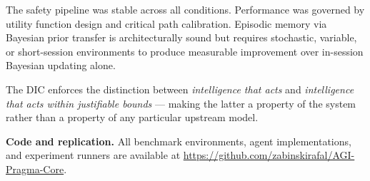 \documentclass[11pt,letterpaper]{article}
\begin{document}
The safety pipeline was stable across all conditions. Performance was governed by
utility function design and critical path calibration. Episodic memory via Bayesian
prior transfer is architecturally sound but requires stochastic, variable, or
short-session environments to produce measurable improvement over in-session
Bayesian updating alone.

The DIC enforces the distinction between \textit{intelligence that acts} and
\textit{intelligence that acts within justifiable bounds} --- making the latter a
property of the system rather than a property of any particular upstream model.

\bigskip
\noindent\textbf{Code and replication.}
All benchmark environments, agent implementations, and experiment runners are
available at \url{https://github.com/zabinskirafal/AGI-Pragma-Core}.

\end{document}
